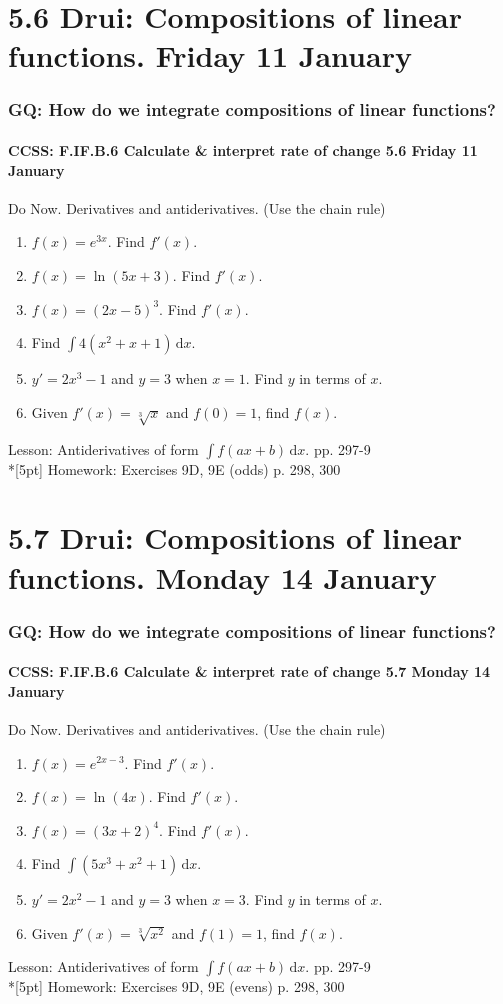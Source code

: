 \documentclass{beamer}
\begin{document}
\section{5.6 Drui: Compositions of linear functions. Friday 11 January}
  \frame
  {
  \frametitle{GQ: How do we integrate compositions of linear functions?}
  \framesubtitle{CCSS: F.IF.B.6 Calculate \& interpret rate of change \hfill \alert{5.6 Friday 11 January}}

  \begin{block}{Do Now. Derivatives and antiderivatives. (Use the chain rule)}
  \begin{enumerate}
    \item $f(x)=e^{3x}$. Find $f'(x)$.
    \item $f(x)= \ln (5x+3)$. Find $f'(x)$.
    \item $f(x)= (2x-5)^3$. Find $f'(x)$.

    \item Find $\int 4(x^2+x+1) \,\mathrm{d}x$.
    \item $y'=2x^3-1$ and $y=3$ when $x=1$. Find $y$ in terms of $x$.
    \item Given $f'(x)=\sqrt[3]{x}$ and $f(0)=1$, find $f(x)$.
  \end{enumerate}
  \end{block}
  Lesson: Antiderivatives of form $\int f(ax+b) \,\mathrm{d}x$. pp. 297-9\\*[5pt]
  Homework: Exercises 9D, 9E (odds) p. 298, 300
}

\section{5.7 Drui: Compositions of linear functions. Monday 14 January}
  \frame
  {
  \frametitle{GQ: How do we integrate compositions of linear functions?}
  \framesubtitle{CCSS: F.IF.B.6 Calculate \& interpret rate of change \hfill \alert{5.7 Monday 14 January}}

  \begin{block}{Do Now. Derivatives and antiderivatives. (Use the chain rule)}
  \begin{enumerate}
    \item $f(x)=e^{2x-3}$. Find $f'(x)$.
    \item $f(x)= \ln (4x)$. Find $f'(x)$.
    \item $f(x)= (3x+2)^4$. Find $f'(x)$.

    \item Find $\int (5x^3+x^2+1) \,\mathrm{d}x$.
    \item $y'=2x^2-1$ and $y=3$ when $x=3$. Find $y$ in terms of $x$.
    \item Given $f'(x)=\sqrt[3]{x^2}$ and $f(1)=1$, find $f(x)$.
  \end{enumerate}
  \end{block}
  Lesson: Antiderivatives of form $\int f(ax+b) \,\mathrm{d}x$. pp. 297-9\\*[5pt]
  Homework: Exercises 9D, 9E (evens) p. 298, 300
}
\end{document}
